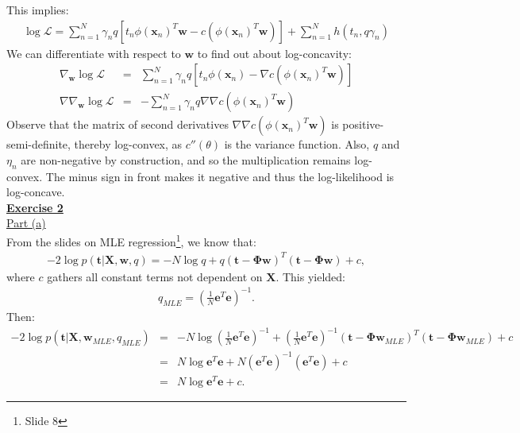 \documentclass[a4paper, 11pt]{article}
\begin{document}
This implies:
\begin{eqnarray}
\log \mathcal{L} = \sum_{n=1}^{N} \gamma_n q [ t_n \phi(\mathbf{x}_n)^T \mathbf{w} - c(\phi(\mathbf{x}_n)^T \mathbf{w}) ] + \sum_{n=1}^{N} h(t_n, q \gamma_n) \nonumber
\end{eqnarray}
We can differentiate with respect to $\mathbf{w}$ to find out about log-concavity:
\begin{eqnarray}
\nabla_{\mathbf{w}} \log \mathcal{L} &=&  \sum_{n=1}^{N} \gamma_n q [ t_n \phi(\mathbf{x}_n) - \nabla c(\phi(\mathbf{x}_n)^T \mathbf{w}) ] \nonumber \\
\nabla \nabla_{\mathbf{w}} \log \mathcal{L} &=& - \sum_{n=1}^{N} \gamma_n q \nabla \nabla c(\phi(\mathbf{x}_n)^T \mathbf{w}) \nonumber
\end{eqnarray}
Observe that the matrix of second derivatives $\nabla \nabla c(\phi(\mathbf{x}_n)^T \mathbf{w})$ is positive-semi-definite, thereby log-convex, as $c''(\theta)$ is the variance function. Also, $q$ and $\eta_n$ are non-negative by construction, and so the multiplication remains log-convex. The minus sign in front makes it negative and  thus the log-likelihood is log-concave.\\
\newpage
\textbf{\underline{Exercise 2}}\\
\newline \underline{Part (a)}\\
\newline From the slides on MLE regression\footnote{Slide 8}, we know that:
\begin{eqnarray}
-2 \log p(\mathbf{t} | \mathbf{X}, \mathbf{w}, q) = -N \log q + q (\mathbf{t} - \mathbf{\Phi w})^T (\mathbf{t} - \mathbf{\Phi w}) + c, \nonumber
\end{eqnarray}
where $c$ gathers all constant terms not dependent on $\mathbf{X}$. This yielded:
\begin{eqnarray}
q_{MLE} = \left( \frac{1}{N} \mathbf{e}^T \mathbf{e} \right)^{-1}. \nonumber
\end{eqnarray}
Then:
\begin{eqnarray}
-2 \log p(\mathbf{t} | \mathbf{X}, \mathbf{w}_{MLE}, q_{MLE}) &=& -N \log \left( \frac{1}{N} \mathbf{e}^T \mathbf{e} \right)^{-1} + \left( \frac{1}{N} \mathbf{e}^T \mathbf{e} \right)^{-1} (\mathbf{t} - \mathbf{\Phi} \mathbf{w}_{MLE})^T (\mathbf{t} - \mathbf{\Phi} \mathbf{w}_{MLE}) + c \nonumber \\
&=& N \log \mathbf{e}^T \mathbf{e} + N \left( \mathbf{e}^T \mathbf{e} \right)^{-1} \left( \mathbf{e}^T \mathbf{e} \right) + c \nonumber \\
&=& N \log \mathbf{e}^T \mathbf{e} + c. \nonumber
\end{eqnarray}
\end{document}
